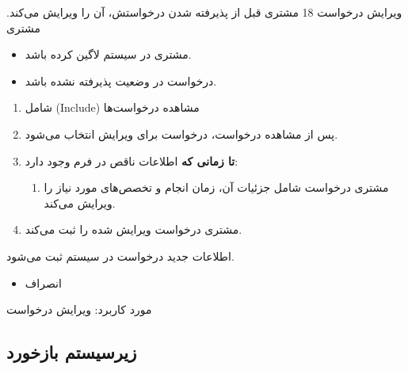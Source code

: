 {
	\usecase
	{ویرایش درخواست}
	{18}
	{مشتری قبل از پذیرفته شدن درخواستش، آن را ویرایش می‌کند.}
	{مشتری}
	{}
	{
		
		\begin{itemize}
			\item
			مشتری در سیستم لاگین کرده باشد.
			
			\item 
			درخواست در وضعیت پذیرفته نشده باشد.
			
		\end{itemize}	
		
		
	}
	{
		\vspace*{-0.6cm}
		\begin{enumerate}
			\item
				شامل (Include) مشاهده درخواست‌ها
				
				\item
				پس از مشاهده درخواست، درخواست برای ویرایش انتخاب می‌شود.
				
				\item 
				\textbf{تا زمانی که}
				اطلاعات ناقص در فرم وجود دارد:
				\begin{enumerate}[label=\theenumi.\arabic*.]
					\item 
	مشتری درخواست شامل جزئیات آن، زمان انجام و تخصص‌های مورد نیاز را ویرایش می‌کند.
				\end{enumerate}
				\item 
			مشتری درخواست ویرایش شده را ثبت می‌کند.
				
			
		\end{enumerate}
	}
	{اطلاعات جدید درخواست در سیستم ثبت می‌شود.}
	{
		\begin{itemize}
			\vspace*{-0.6cm}
			\item انصراف
		\end{itemize}
	}
	{
		مورد کاربرد: ویرایش درخواست
	}
	
}



\newpage

\subsection{زیرسیستم بازخورد}

